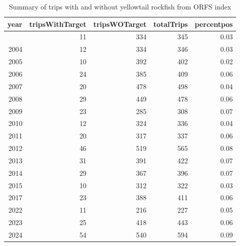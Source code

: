 \documentclass[
]{scrartcl}
\begin{document}
\begin{landscape}
\begin{longtable}
\end{longtable}

\endgroup

\end{landscape}

\newpage{}

\begingroup
\fontsize{9.0pt}{10.8pt}\selectfont

\begin{longtable}{rrrrr}

\caption{\label{tbl-yelloweye_percent_pos_ORFS}Summary of trips with and
without yellowtail rockfish from ORFS index}

\tabularnewline

\toprule
year & tripsWithTarget & tripsWOTarget & totalTrips & percentpos \\ 
\midrule\addlinespace[2.5pt]
2001 & 11 & 334 & 345 & 0.03 \\ 
2004 & 12 & 334 & 346 & 0.03 \\ 
2005 & 10 & 392 & 402 & 0.02 \\ 
2006 & 24 & 385 & 409 & 0.06 \\ 
2007 & 20 & 478 & 498 & 0.04 \\ 
2008 & 29 & 449 & 478 & 0.06 \\ 
2009 & 23 & 285 & 308 & 0.07 \\ 
2010 & 12 & 324 & 336 & 0.04 \\ 
2011 & 20 & 317 & 337 & 0.06 \\ 
2012 & 46 & 519 & 565 & 0.08 \\ 
2013 & 31 & 391 & 422 & 0.07 \\ 
2014 & 29 & 367 & 396 & 0.07 \\ 
2015 & 10 & 312 & 322 & 0.03 \\ 
2017 & 23 & 388 & 411 & 0.06 \\ 
2022 & 11 & 216 & 227 & 0.05 \\ 
2023 & 25 & 418 & 443 & 0.06 \\ 
2024 & 54 & 540 & 594 & 0.09 \\ 
\bottomrule

\end{longtable}

\endgroup

\begingroup
\fontsize{9.0pt}{10.8pt}\selectfont
\end{document}
